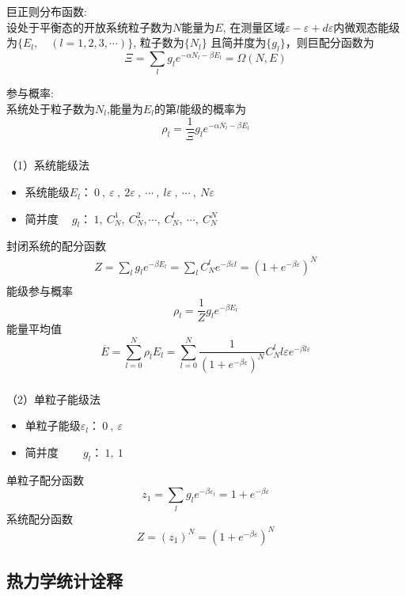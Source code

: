 \begin{frame}
  \frametitle{}
  \alert{巨正则分布函数:} \\ 
  设处于平衡态的开放系统粒子数为$N$能量为$E$, 在测量区域$\varepsilon - \varepsilon+ d\varepsilon $内微观态能级为$\{ E_l, \quad (l=1,2,3,\cdots )\}$, 粒子数为$\{ N_l \}$ 且简并度为$\{ g_l \}$，则巨配分函数为
  \[ \Xi= \sum_l g_l e^{- \alpha  N_l - \beta E_l }  = \Omega(N, E)\]  

  \alert{参与概率:}  \\
  系统处于粒子数为$ N_l$,能量为$ E_l $的第$l$能级的概率为 
  \[ \rho _l  =  \frac{1}{\Xi} g_l e^{- \alpha  N_l - \beta E_l } \] 
\end{frame} 

\begin{frame}
  \frametitle{}
\解 （1）系统能级法
\begin{itemize}
  \item 系统能级$E_l$：$~0~,~\varepsilon~, ~2\varepsilon~, ~\cdots~ , ~l\varepsilon~, ~\cdots~, ~N \varepsilon~ $ 
  \item 简并度$\quad~ g_l$：$~1,~C_N^1, ~C_N^2, \cdots , ~C_N^l, ~\cdots, ~C_N^N $
\end{itemize}
封闭系统的配分函数
\[\begin{aligned}
 Z = \sum_l g_l e^{-\beta E_l} = \sum_l C_N^l e^{-\beta \varepsilon l} = (1+e^{-\beta \varepsilon})^N \\ 
\end{aligned} 
  \]
  能级参与概率
  \[ \rho _l = \frac{1}{Z} g_l e^{-\beta E_l} \]
  能量平均值
  \[ \overline{E} = \sum_{l=0}^N \rho _l E_l = \sum_{l=0}^N\frac{1}{(1+e^{-\beta \varepsilon})^N } C_N^l l\varepsilon  e^{-\beta l\varepsilon} \]
\end{frame} 

\begin{frame}
  \frametitle{}
  （2）单粒子能级法
  \begin{itemize}
    \item 单粒子能级$\varepsilon_l$：$~0~,~\varepsilon~$ 
    \item 简并度$\quad\quad~ g_l$：$~1,~1$
  \end{itemize}
  单粒子配分函数 
  \[z_1 = \sum_l g_l e^{-\beta \varepsilon_l} = 1+ e^{-\beta \varepsilon} \]
  系统配分函数
  \[Z = (z_1)^N =  (1+e^{-\beta \varepsilon})^N\]
\end{frame} 

\subsection{热力学统计诠释}

